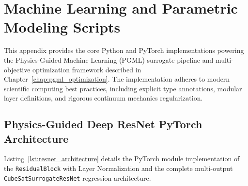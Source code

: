 
\chapter{Machine Learning and Parametric Modeling Scripts}
\label{app:code_listings}

This appendix provides the core Python and PyTorch implementations powering the Physics-Guided Machine Learning (PGML) surrogate pipeline and multi-objective optimization framework described in Chapter~\ref{chap:pgml_optimization}. The implementation adheres to modern scientific computing best practices, including explicit type annotations, modular layer definitions, and rigorous continuum mechanics regularization.

\section{Physics-Guided Deep ResNet PyTorch Architecture}
\label{sec:app_resnet_code}

Listing~\ref{lst:resnet_architecture} details the PyTorch module implementation of the \texttt{ResidualBlock} with Layer Normalization and the complete multi-output \texttt{CubeSatSurrogateResNet} regression architecture.

